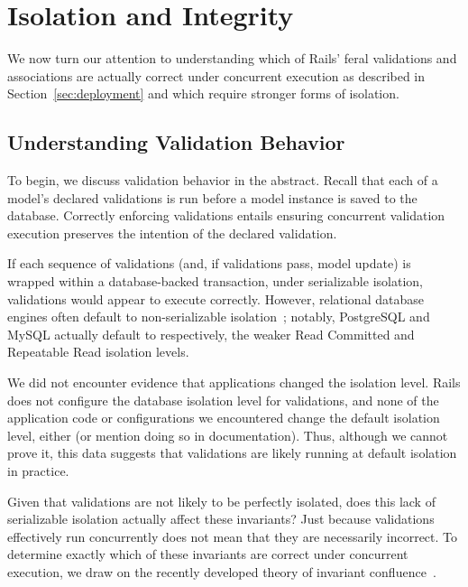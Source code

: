 
\section{Isolation and Integrity}
\label{sec:apps}

We now turn our attention to understanding which of Rails' feral
validations and associations are actually correct under concurrent
execution as described in Section~\ref{sec:deployment} and which
require stronger forms of isolation.

\subsection{Understanding Validation Behavior}

To begin, we discuss validation behavior in the abstract. Recall that
each of a model's declared validations is run before a model instance
is saved to the database. Correctly enforcing validations entails
ensuring concurrent validation execution preserves the intention of
the declared validation.

 If each sequence of validations (and, if validations pass, model
update) is wrapped within a database-backed transaction, under
serializable isolation, validations would appear to execute
correctly. However, relational database engines often default to
non-serializable isolation~\cite{hat-vldb}; notably, PostgreSQL and
MySQL actually default to respectively, the weaker Read Committed and
Repeatable Read isolation levels.

We did not encounter evidence that applications changed the isolation
level. Rails does not configure the database isolation level for
validations, and none of the application code or configurations we
encountered change the default isolation level, either (or mention
doing so in documentation). Thus, although we cannot prove it, this
data suggests that validations are likely running at default isolation
in practice.

 Given that validations are
not likely to be perfectly isolated, does this lack of serializable
isolation actually affect these invariants?  Just because validations
effectively run concurrently does not mean that they are necessarily
incorrect. To determine exactly which of these invariants are correct
under concurrent execution, we draw on the recently developed theory
of invariant confluence~\cite{coord-avoid}.

